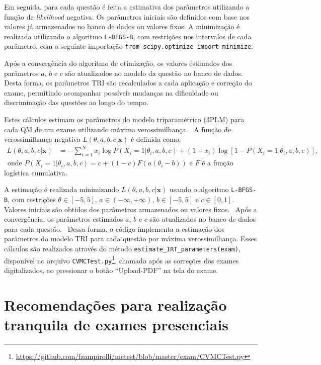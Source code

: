 Em seguida, para cada questão é feita a estimativa dos parâmetros utilizando a função de \textit{likelihood} negativa. Os parâmetros iniciais são definidos com base nos valores já armazenados no banco de dados ou valores fixos. A minimização é realizada utilizando o algoritmo \verb|L-BFGS-B|, com restrições nos intervalos de cada parâmetro, com a seguinte importação \verb|from scipy.optimize import minimize|.

Após a convergência do algoritmo de otimização, os valores estimados dos parâmetros $a$, $b$ e $c$  são atualizados no modelo da questão no banco de dados. Desta forma, os parâmetros TRI são recalculados a cada aplicação e correção do exame, permitindo acompanhar possíveis mudanças na dificuldade ou discriminação das questões ao longo do tempo.

Estes cálculos estimam os parâmetros do modelo triparamétrico (3PLM) para cada QM de um exame utilizando máxima verossimilhança.
\
A função de verossimilhança negativa $L(\theta,a,b,c|\mathbf{x})$ é definida como:
\
\begin{align*}
L(\theta,a,b,c|\mathbf{x}) &= -\sum_{i=1}^N x_i \log P(X_i=1|\theta_i, a,b,c) + (1-x_i)\log[1-P(X_i=1|\theta_i, a,b,c)],
\end{align*}
\
onde $P(X_i=1|\theta_i, a,b,c) = c + (1-c)F(a(\theta_i - b))$ e $F$ é a função logística cumulativa.

A estimação é realizada minimizando $L(\theta,a,b,c|\mathbf{x})$ usando o algoritmo \verb|L-BFGS-B|, com restrições $\theta\in[-5,5]$, $a\in(-\infty,+\infty)$, $b\in[-5,5]$ e $c\in[0,1]$. Valores iniciais são obtidos dos parâmetros armazenados ou valores fixos.
\
Após a convergência, os parâmetros estimados $a$, $b$ e $c$ são atualizados no banco de dados para cada questão.
\
Dessa forma, o código implementa a estimação dos parâmetros do modelo TRI para cada questão por máxima verossimilhança. Esses cálculos são realizados através do método \verb|estimate_IRT_parameters(exam)|, disponível no arquivo \verb|CVMCTest.py|\footnote{\url{https://github.com/fzampirolli/mctest/blob/master/exam/CVMCTest.py}}, chamado após as correções dos exames digitalizados, ao pressionar o botão ``Upload-PDF'' na tela do exame.






\section{Recomendações para realização tranquila de exames presenciais}\label{sec:recomendacoesCap8}


